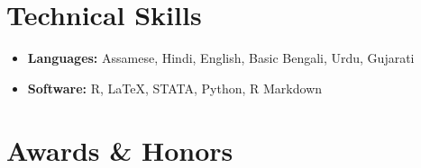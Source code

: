 \documentclass[letterpaper,11pt]{article}
\begin{document}
\section{Technical Skills}
\vspace{3pt}
\begin{itemize}[leftmargin=0.15in, label={}]
  \item \textbf{\color{primarycolor}Languages:} \color{textgray}Assamese, Hindi, English, Basic Bengali, Urdu, Gujarati \\[3pt]
  \item \textbf{\color{primarycolor}Software:} \color{textgray}R, \LaTeX, STATA, Python, R Markdown \\
\end{itemize}

\section{Awards \& Honors}
\vspace{3pt}
\end{document}
